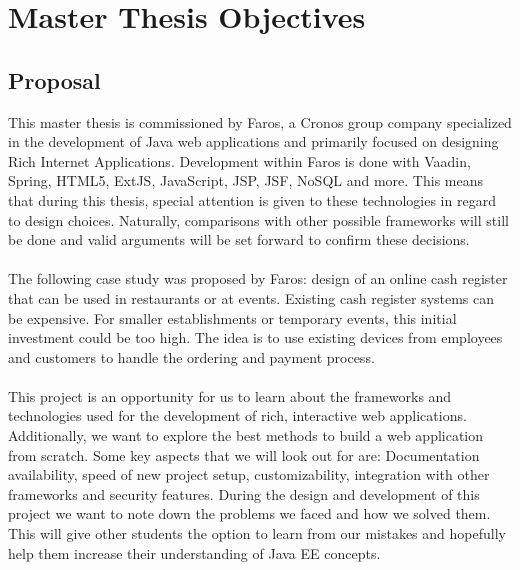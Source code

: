 \documentclass[12pt]{article}
\begin{document}
\section{Master Thesis Objectives}
\begin{multicols}{2}
\subsection{Proposal}
This master thesis is commissioned by Faros, a Cronos group company specialized in the development of Java web applications and primarily focused on designing Rich Internet Applications. Development within Faros is done with Vaadin, Spring, HTML5, ExtJS, JavaScript, JSP, JSF, NoSQL and more.\cite{farosProposal} This means that during this thesis, special attention is given to these technologies in regard to design choices. Naturally, comparisons with other possible frameworks will still be done and valid arguments will be set forward to confirm these decisions.
\\\\
The following case study was proposed by Faros: design of an online cash register that can be used in restaurants or at events. Existing cash register systems can be expensive. For smaller establishments or temporary events, this initial investment could be too high. The idea is to use existing devices from employees and customers to handle the ordering and payment process.
\\\\
This project is an opportunity for us to learn about the frameworks and technologies used for the development of rich, interactive web applications. Additionally, we want to explore the best methods to build a web application from scratch. Some key aspects that we will look out for are: Documentation availability, speed of new project setup, customizability, integration with other frameworks and security features. During the design and development of this project we want to note down the problems we faced and how we solved them. This will give other students the option to learn from our mistakes and hopefully help them increase their understanding of Java EE concepts. 


\end{multicols}
\end{document}
